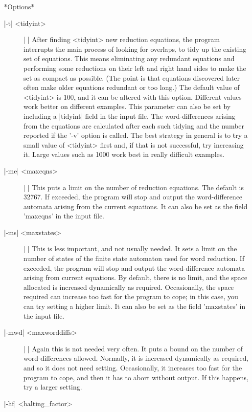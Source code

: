 *Options*
\begin{description}
\item[|-t| <tidyint>] | |\newline
After finding <tidyint> new reduction equations, the program interrupts
the main process of looking for overlaps, to tidy up the existing set of
equations. This means eliminating any redundant equations and performing
some reductions on their left and right hand sides to make the set as
compact as possible. (The point is that equations discovered later often
make older equations redundant or too long.) The default value of
<tidyint> is 100, and it can be altered with this option. Different values
work better on different examples. This parameter can also be set by
including a |tidyint| field in the input file.
The word-differences arising from the equations are calculated
after each such tidying and the number reported if the '-v' option is called.
The best strategy in general is to try a small value of <tidyint> first and,
if that is not successful, try increasing it. Large values such as 1000 work
best in really difficult examples.
\item[|-me| <maxeqns>] | |\newline
This puts a limit on the number of reduction equations.
The default is 32767.
If exceeded, the program will stop and output the word-difference
automata arising from the current equations.
It can also be set as the field 'maxeqns' in the input file.
\item[|-ms| <maxstates>] | |\newline
This is less important, and not usually needed.
It sets a limit on the number of states of the finite state automaton
used for word reduction.
If exceeded, the program will stop and output the 
word-difference automata arising from current equations.
By default, there is no limit, and the space allocated is increased
dynamically as required. Occasionally, the space required can increase too fast
for the program to cope; in this case, you can try setting a higher limit.
It can also be set as the field 'maxstates' in the input file.
\item[|-mwd| <maxworddiffs>] | |\newline
Again this is not needed very often. It puts a bound on the number of
word-differences allowed. Normally, it is increased dynamically as required,
and so it does not need setting. Occasionally, it increases too fast for
the program to cope, and then it has to abort without output. If this
happens, try a larger setting.
\item[|-hf| <halting\_factor>]

\end{description}
